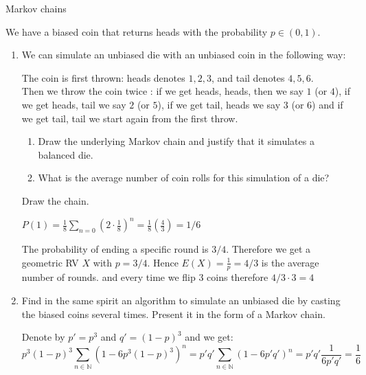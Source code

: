 \documentclass[a4paper,11pt]{exam}
\newcommand{\N}{\mathbb{N}}
\begin{document}
\begin{questions}
	

\begin{EnvFullwidth}
	\colorbox{gris}{
		\begin{minipage}[c]{\textwidth}
			Markov chains
		\end{minipage}
	}
\end{EnvFullwidth}



\question

We have a biased coin that returns heads with the probability  $ p\in(0,1)$.
\begin{enumerate}
	\item We can simulate an unbiased die with an unbiased coin in the following way:
	
	The coin is first thrown: heads denotes $ 1,2,3 $, and tail denotes $ 4,5,6 $. 
	\\
	Then we throw the coin twice : if we get heads, heads, then we say $ 1 $ (or $ 4 $), if we get heads, tail we say $ 2 $ (or $ 5 $), if we get tail, heads we say $ 3 $ (or $ 6 $) and if we get tail, tail we start again from the first throw.
	
	\begin{enumerate}
		\item Draw the underlying Markov chain and justify that it simulates a balanced die.
		\item What is the average number of coin rolls for this simulation of a die?
	\end{enumerate}

	\begin{solution}
		Draw the chain.
		
		$P(1)=\frac{1}{8}\sum_{n=0}\left(2\cdot\frac{1}{8}\right)^n = \frac{1}{8}\left(\frac{4}{3}\right) = 1/6$
		
		The probability of ending a specific round is $3/4$. Therefore we get a geometric RV $X$ with $p=3/4$. Hence $E(X) = \frac{1}{p}=4/3$ is the average number of rounds. and every time we flip 3 coins therefore $ 4 / 3 \cdot 3 = 4 $
		
		
	\end{solution}
	
	\item Find in the same spirit an algorithm to simulate an unbiased die by casting the biased coins several times. Present it in the form of a Markov chain.
	
	\begin{solution}
		Denote by $p'=p^3$ and $q'=(1-p)^3$ and we get:
		\[
			p^3(1-p)^3\sum_{n\in\N}(1-6p^3(1-p)^3)^n=p'q'\sum_{n\in\N}(1-6p'q')^n=p'q'\frac{1}{6p'q'}=\frac{1}{6}
		\]
	\end{solution}
	

\end{enumerate}
\end{questions}
\end{document}
